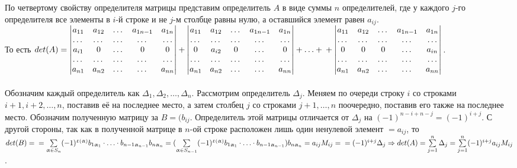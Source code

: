 \begin{Proof}
	По четвертому свойству определителя матрицы представим определитель $A$ в виде суммы $n$ определителей, где
	у каждого $j$-го определителя все элементы в $i$-й строке и не $j$-м столбце равны нулю, а оставшийся элемент равен $a_{ij}$.\\ То есть $det(A) = \begin{vmatrix}
		a_{11} & a_{12} & \dots & a_{1n-1} & a_{1n} \\
		\dots & \dots & \dots & \dots & \dots \\
		a_{i1} & 0 & \dots & 0 & 0 \\  
		\dots & \dots & \dots & \dots & \dots \\
		a_{n1} & a_{n2} & \dots & \dots & a_{nn} \\
	\end{vmatrix}
	+
	\begin{vmatrix}
		a_{11} & a_{12} & \dots & a_{1n-1} & a_{1n} \\
		\dots & \dots & \dots & \dots & \dots \\
		0 & a_{i2} & 0 & \dots & 0 \\  
		\dots & \dots & \dots & \dots & \dots \\
		a_{n1} & a_{n2} & \dots & \dots & a_{nn} \\
	\end{vmatrix}
	+ \ldots + \\\\
	+
	\begin{vmatrix}
		a_{11} & a_{12} & \dots & a_{1n-1} & a_{1n} \\
		\dots & \dots & \dots & \dots & \dots \\
		0 & 0 & 0 & \dots & a_{in} \\  
		\dots & \dots & \dots & \dots & \dots \\
		a_{n1} & a_{n2} & \dots & \dots & a_{nn} \\
	\end{vmatrix}
	$.\\\\
	Обозначим каждый определитель как $\Delta_1,\Delta_2,\dots,\Delta_n$.
	Рассмотрим определитель $\Delta_j$. Меняем по очереди строку $i$ со строками $i+1,i+2,\dots,n$, поставив её на последнее место, а затем столбец $j$ со строками $j+1,\dots,n$ поочередно, поставив его также на последнее место. Обозначим полученную матрицу за $B = (b_{ij}$. Определитель этой матрицы отличается от $\Delta_{j}$ на $(-1)^{n-i+n-j} = (-1)^{i+j}$. С другой стороны, так как в полученной матрице в $n$-ой строке расположен лишь один ненулевой элемент $= a_{ij}$, то $det(B) = \\
	= \sum\limits_{\alpha \in S_n}(-1)^{\upvarepsilon(\alpha)}b_{1\alpha_1} \cdot \ldots \cdot b_{n-1\alpha_{n-1}}b_{n\alpha_n} = (\sum\limits_{\alpha \in S_{n-1}}(-1)^{\upvarepsilon(\alpha)}b_{1\alpha_1}\cdot \ldots \cdot b_{n-1\alpha_{n-1}})b_{n\alpha_n} = a_{ij}M_{ij} = \\
	=(-1)^{i+j}\Delta_{j} \Rightarrow det(A) = \sum\limits^{n}_{j=1}\Delta_{j} = \sum\limits^{n}_{j=1}(-1)^{i+j}a_{ij}M_{ij}$. 
\end{Proof}
